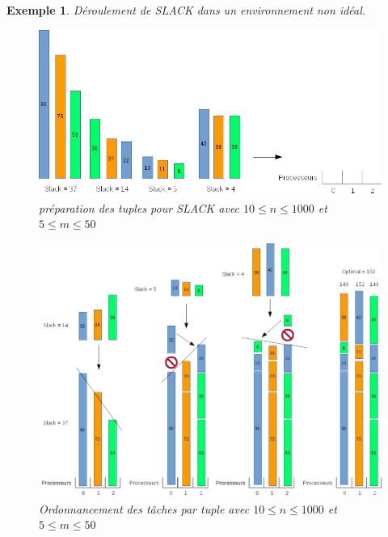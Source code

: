 \documentclass[a4paper,12pt]{report}
\theoremstyle{plain}				%
\newtheorem{example}{Exemple}
\theoremstyle{definition}				%
\begin{document}
\begin{example}
Déroulement de SLACK dans un environnement non idéal.

\begin{figure}
{\centering
\includegraphics[width=\columnwidth]{Slack_Non_Unif_Exemple_PasOk1.png}
\caption{préparation des tuples pour SLACK avec $10\leq n \leq 1000$ et $5\leq m \leq 50$}
\label{ex:SLACKPasOK1}
\par}
\end{figure}

\begin{figure}
{\centering
\includegraphics[width=\columnwidth]{Slack_Non_Unif_Exemple_PasOk2.png}
\caption{Ordonnancement des tâches par tuple avec $10\leq n \leq 1000$ et $5\leq m \leq 50$}
\label{ex:SLACKPasOK2}
\par}
\end{figure}


\end{example}
\end{document}
